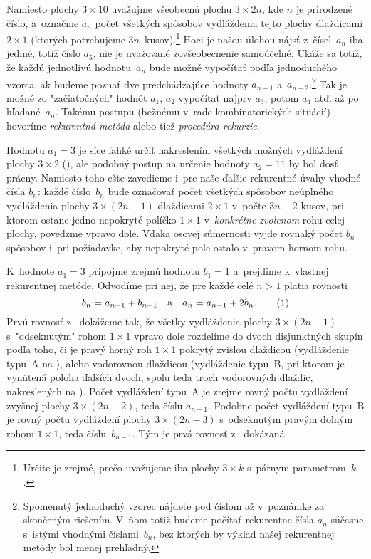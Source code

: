 {%
Namiesto plochy $3\times10$ uvažujme všeobecnú plochu $3\times2n$,
kde $n$ je prirodzené číslo, a~označme $a_n$ počet všetkých
spôsobov vydláždenia tejto plochy dlaždicami
$2\times1$ (ktorých potrebujeme $3n$~kusov).\footnote{Určite je zrejmé,
prečo uvažujeme iba plochy $3\times k$ s~párnym parametrom~$k$.}
Hoci je našou úlohou nájsť z~čísel~$a_n$ iba jediné, totiž
číslo $a_5$, nie je uvažované zovšeobecnenie samoúčelné.
Ukáže sa totiž, že každú jednotlivú hodnotu~$a_n$ bude možné
vypočítať podľa jednoduchého vzorca, ak budeme poznať dve
predchádzajúce hodnoty $a_{n-1}$ a~$a_{n-2}$.\footnote{Spomenutý
jednoduchý vzorec nájdete pod číslom  až v~poznámke
za skončeným riešením. V~ňom totiž budeme počítať
rekurentne čísla $a_n$ súčasne s~istými vhodnými číslami~$b_n$,
bez ktorých by výklad našej rekurentnej metódy bol menej prehľadný.}
Tak je možné zo "začiatočných" hodnôt $a_1$, $a_2$ vypočítať najprv $a_3$,
potom $a_4$ atď. až po hľadané~$a_n$.
Takému postupu (bežnému v~rade kombinatorických situácií) hovoríme {\it rekurentná metóda\/} alebo
tiež {\it procedúra rekurzie}.

Hodnotu $a_1=3$ je síce ľahké určiť nakreslením všetkých
možných vydláždení plochy $3\times2$ (\obr), ale podobný postup
na určenie hodnoty $a_2=11$ by bol dosť prácny. Namiesto toho ešte
zavedieme i~pre naše ďalšie rekurentné úvahy vhodné čísla
$b_n$: každé číslo~$b_n$ bude označovať
počet všetkých spôsobov neúplného vydláždenia plochy
$3\times(2n-1)$ dlaždicami $2\times1$ v~počte $3n-2$ kusov,
pri ktorom ostane jedno nepokryté políčko $1\times1$
v~{\it konkrétne zvolenom\/} rohu celej plochy, povedzme vpravo dole.
Vďaka osovej súmernosti vyjde rovnaký počet $b_n$ spôsobov
i~pri požiadavke, aby nepokryté pole ostalo v~pravom hornom rohu.
%

K~hodnote $a_1=3$ pripojme zrejmú hodnotu $b_1=1$ a~prejdime
k~vlastnej rekurentnej metóde. Odvodíme pri nej, že pre každé
celé $n>1$ platia rovnosti
$$
b_n=a_{n-1}+b_{n-1}\quad\text{a}\quad
a_n=a_{n-1}+2b_n.
\tag1$$
Prvú rovnosť z~ dokážeme tak, že všetky vydláždenia plochy
$3\times(2n-1)$ s~"odseknutým" rohom $1\times1$ vpravo dole
rozdelíme do dvoch disjunktných skupín podľa toho, či je pravý
horný roh $1\times1$ pokrytý zvislou dlaždicou (vydláždenie typu~A na \obr),
alebo vodorovnou dlaždicou (vydláždenie typu~B, pri ktorom je
vynútená poloha ďalších dvoch, spolu teda troch vodorovných
dlaždíc, nakreslených na ). Počet
vydláždení typu~A je zrejme rovný počtu vydláždení
zvyšnej plochy $3\times(2n-2)$,
teda číslu $a_{n-1}$. Podobne počet
vydláždení typu~B je rovný počtu vydláždení plochy
$3\times(2n-3)$ s~odseknutým pravým dolným rohom $1\times1$, teda
číslu~$b_{n-1}$. Tým je prvá rovnosť z~ dokázaná.
%

}
